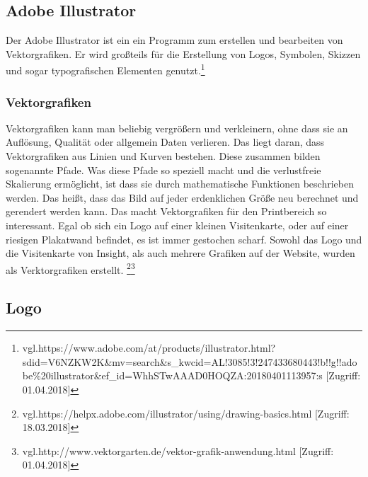 \subsection{Adobe Illustrator}
Der Adobe Illustrator ist ein ein Programm zum erstellen und bearbeiten von Vektorgrafiken. Er wird großteils für die Erstellung von Logos, Symbolen, Skizzen und sogar typografischen Elementen genutzt.\footnote{\label{} vgl.https://www.adobe.com/at/products/illustrator.html?sdid=V6NZKW2K\&mv=search\&s\_kwcid=AL!3085!3!247433680443!b!!g!!adobe\%20illustrator\&ef\_id=WhhSTwAAAD0HOQZA:20180401113957:s [Zugriff: 01.04.2018]}
\subsubsection{Vektorgrafiken}
Vektorgrafiken kann man beliebig vergrößern und verkleinern, ohne dass sie an Auflösung, Qualität oder allgemein Daten verlieren. Das liegt daran, dass Vektorgrafiken aus Linien und Kurven bestehen. Diese zusammen bilden sogenannte Pfade. Was diese Pfade so speziell macht und die verlustfreie Skalierung ermöglicht, ist dass sie durch mathematische Funktionen beschrieben werden. Das heißt, dass das Bild auf jeder erdenklichen Größe neu berechnet und gerendert werden kann. Das macht Vektorgrafiken für den Printbereich so interessant. Egal ob sich ein Logo auf einer kleinen Visitenkarte, oder auf einer riesigen Plakatwand befindet, es ist immer gestochen scharf. Sowohl das Logo und die Visitenkarte von Insight, als auch mehrere Grafiken auf der Website, wurden als Verktorgrafiken erstellt.
\footnote{\label{} vgl.https://helpx.adobe.com/illustrator/using/drawing-basics.html [Zugriff: 18.03.2018]}\footnote{\label{} vgl.http://www.vektorgarten.de/vektor-grafik-anwendung.html [Zugriff: 01.04.2018]}

\subsection{Logo}
